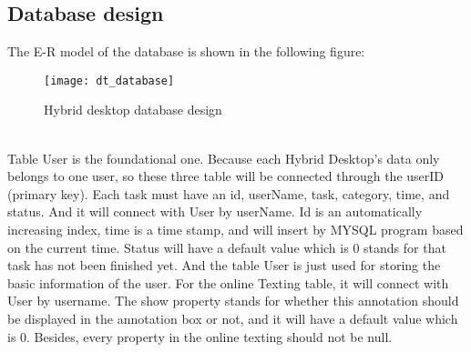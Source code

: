 \subsection{Database design}
The E-R model of the database is shown in the following figure:
\\
\begin{figure}[h]
    \centering
	\texttt{[image: dt\_database]}
    \caption{Hybrid desktop database design}
    \label{fig:mesh1}
\end{figure}
\\
Table User is the foundational one. Because each Hybrid Desktop’s data only belongs to one user, so these three table will be connected through the userID (primary key). Each task must have an id, userName, task, category, time, and status. And it will connect with User by userName. Id is an automatically increasing index, time is a time stamp, and will insert by MYSQL program based on the current time. Status will have a default value which is 0 stands for that task has not been finished yet. And the table User is just used for storing the basic information of the user. For the online Texting table, it will connect with User by username. The show property stands for whether this annotation should be displayed in the annotation box or not, and it will have a default value which is 0. Besides, every property in the online texting should not be null.


